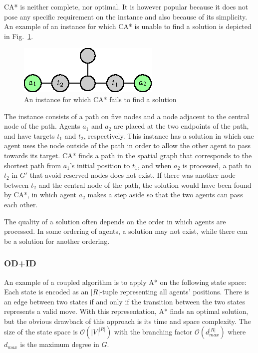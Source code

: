 CA* is neither complete, nor optimal. It is however popular because it does not pose any specific requirement on the instance and also because of its simplicity.
An example of an instance for which CA* is unable to find a solution is depicted in Fig.~\ref{fig:castarfail}.
\begin{figure}
\centering
	\includegraphics[scale=1.5]{figurer/castarfail.eps}
\caption{An instance for which CA* fails to find a solution}
\label{fig:castarfail}
\end{figure}
The instance consists of a path on five nodes and a node adjacent to the central node of the path.
Agents $a_1$ and $a_2$ are placed at the two endpoints of the path, and have targets $t_1$ and $t_2$, respectively.
This instance has a solution in which one agent uses the node outside of the path in order to allow the other agent to pass towards its target.
CA* finds a path in the spatial graph that corresponds to the shortest path from $a_1$'s initial position to $t_1$, and when $a_2$ is processed,
a path to $t_2$ in $G'$ that avoid reserved nodes does not exist.
If there was another node between $t_2$ and the central node of the path, the solution would have been found by CA*, in which agent $a_2$ makes a step aside so that the two agents can pass each other.

The quality of a solution often depends on the order in which agents are processed. 
In some ordering of agents, a solution may not exist, while there can be a solution for another ordering.

\subsubsection{OD+ID}

An example of a coupled algorithm is to apply A* on the following state space:
Each state is encoded as an $|R|$-tuple representing all agents' positions.
There is an edge between two states if and only if the transition between the two states represents a valid move.
With this representation, A* finds an optimal solution, but the obvious drawback of this approach is its time and space complexity.
The size of the state space is $\mathcal{O}(|V|^{|R|})$ with the branching factor $\mathcal{O}(d_{max}^{|R|})$ where $d_{max}$ is the maximum degree in $G$.

